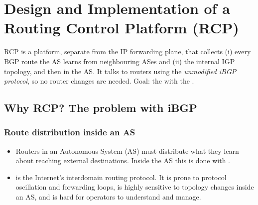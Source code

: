 \chapter{Design and Implementation of a Routing Control Platform (RCP)}

\begin{keybox}
RCP is a  platform, separate from the IP forwarding plane, that collects (i) every BGP route the AS learns from neighbouring ASes and (ii) the internal IGP topology, and then  in the AS. It talks to routers using the \emph{unmodified iBGP protocol}, so no router changes are needed. Goal: the  with the .
\end{keybox}

\section{Why RCP? The problem with iBGP}
\subsection{Route distribution inside an AS}
\begin{itemize}
\item Routers in an Autonomous System (AS) must distribute what they learn about reaching external destinations. Inside the AS this is done with .
\item {} is the Internet's interdomain routing protocol. It is prone to protocol oscillation and forwarding loops, is highly sensitive to topology changes inside an AS, and is hard for operators to understand and manage.
\end{itemize}

